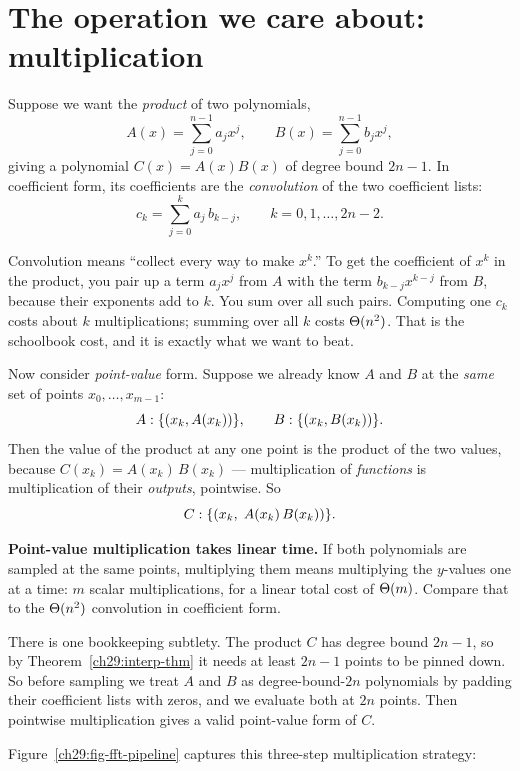 \section{The operation we care about: multiplication}

Suppose we want the \emph{product} of two polynomials,
\[
A(x) = \sum_{j=0}^{n-1} a_j x^j,\qquad B(x) = \sum_{j=0}^{n-1} b_j x^j,
\]
giving a polynomial $C(x) = A(x)B(x)$ of degree bound $2n-1$. In coefficient form,
its coefficients are the \emph{convolution} of the two coefficient lists:
\[
c_k = \sum_{j=0}^{k} a_j\, b_{k-j}, \qquad k = 0,1,\dots,2n-2.
\]

\begin{intuitionbox}
Convolution means ``collect every way to make $x^k$.'' To get the coefficient of
$x^k$ in the product, you pair up a term $a_j x^j$ from $A$ with the term
$b_{k-j}x^{k-j}$ from $B$, because their exponents add to $k$. You sum over all such
pairs. Computing one $c_k$ costs about $k$ multiplications; summing over all $k$
costs $\Theta(n^2)$. That is the schoolbook cost, and it is exactly what we want to
beat.
\end{intuitionbox}

Now consider \emph{point-value} form. Suppose we already know $A$ and
$B$ at the \emph{same} set of points $x_0,\dots,x_{m-1}$:
\[
A: \{(x_k, A(x_k))\},\qquad B:\{(x_k, B(x_k))\}.
\]
Then the value of the product at any one point is the product of the two
values, because $C(x_k) = A(x_k)\,B(x_k)$ --- multiplication of \emph{functions} is
multiplication of their \emph{outputs}, pointwise. So
\[
C: \{(x_k,\; A(x_k)\,B(x_k))\}.
\]

\begin{focusbox}
\textbf{Point-value multiplication takes linear time.} If both polynomials are
sampled at the same points, multiplying them means multiplying the $y$-values one
at a time: $m$ scalar multiplications, for a linear total cost of $\Theta(m)$. Compare that
to the $\Theta(n^2)$ convolution in coefficient form.
\end{focusbox}

There is one bookkeeping subtlety. The product $C$ has degree bound $2n-1$, so by
Theorem~\ref{ch29:interp-thm} it needs at least $2n-1$ points to be pinned down. So
before sampling we treat $A$ and $B$ as degree-bound-$2n$ polynomials by padding their
coefficient lists with zeros, and we evaluate both at $2n$ points. Then pointwise
multiplication gives a valid point-value form of $C$.

Figure~\ref{ch29:fig-fft-pipeline} captures this three-step multiplication strategy:

